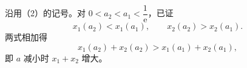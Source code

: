 \begin{answer}

沿用（2）的记号。对 $0<a_2<a_1<\dfrac1{\mathrm e}$，已证
\nopagebreak[4]
\[x_1(a_2)<x_1(a_1),\qquad x_2(a_2)>x_2(a_1).\]
两式相加得
\nopagebreak[4]
\[x_1(a_2)+x_2(a_2)>x_1(a_1)+x_2(a_1),\]
即 $a$ 减小时 $x_1+x_2$ 增大。




\end{answer}